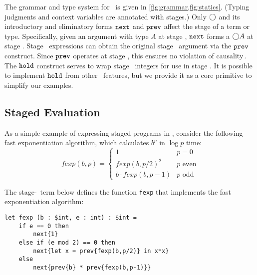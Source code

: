 The grammar and type system for \lang\ is given in
\ref{fig:grammar,fig:statics}. (Typing judgments and context variables are annotated with stages.)
Only $\bigcirc$ and its introductory and eliminatory forms ${\tt next}$ and ${\tt prev}$ affect the stage
of a term or type.
Specifically, given an argument with type $A$ at stage \bbtwo, ${\tt next}$ forms a $\bigcirc A$ at stage \bbone.  
Stage \bbtwo\ expressions can obtain the original stage \bbtwo\ argument via the ${\tt prev}$ construct.  
Since ${\tt prev}$ operates at stage \bbtwo, this ensures no violation of causality\,\cite{cave14}.
The ${\tt hold}$ construct serves to wrap stage \bbone\ integers for use in stage \bbtwo.  
It is possible to implement ${\tt hold}$ from other \lang\ features, but
we provide it as a core primitive to simplify our examples. 

\subsection{Staged Evaluation}
\label{sec:stagedsemantics}

As a simple example of expressing staged programs in \lang, consider the following fast exponentiation algorithm, which 
calculates $b^p$ in $\log p$ time:
\[
	\mathit{fexp}(b,p) = \left \{ \begin{array}{ll} 
		1 &  p = 0 \\ 
		\mathit{fexp}(b,p/2)^2 & p \text{ even} \\ 
		b \cdot \mathit{fexp}(b,p-1) & p \text{ odd} \end{array}
	\right .
\]

\noindent
The stage-\bbone\ term below defines the function {\tt fexp} that implements the fast exponentiation algorithm:%

\begin{lstlisting} 
let fexp (b : $int, e : int) : $int =
	if e == 0 then
		next{1}
	else if (e mod 2) == 0 then
		next{let x = prev{fexp(b,p/2)} in x*x}
	else
		next{prev{b} * prev{fexp(b,p-1)}}		
\end{lstlisting}

